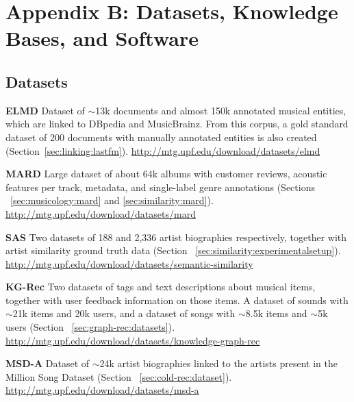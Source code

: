 
\chapter{Appendix B: Datasets, Knowledge Bases, and Software}
\label{appendix:datasets}

\section{Datasets}
\label{appendix:datasets:datasets}

\noindent \textbf{ELMD} Dataset of $\sim$13k documents and almost 150k annotated musical entities, which are linked to DBpedia and MusicBrainz. From this corpus, a gold standard dataset of 200 documents with manually annotated entities is also created (Section~\ref{sec:linking:lastfm}). \url{http://mtg.upf.edu/download/datasets/elmd}

\vspace{0.2cm}

\noindent \textbf{MARD} Large dataset of about 64k albums with customer reviews, acoustic features per track, metadata, and single-label genre annotations (Sections ~\ref{sec:musicology:mard} and \ref{sec:similarity:mard}). \url{http://mtg.upf.edu/download/datasets/mard}

\vspace{0.2cm}

\noindent \textbf{SAS} Two datasets of 188 and 2,336 artist biographies respectively, together with artist similarity ground truth data (Section ~\ref{sec:similarity:experimentalsetup}). \url{http://mtg.upf.edu/download/datasets/semantic-similarity}

\vspace{0.2cm}

\noindent \textbf{KG-Rec} Two datasets of tags and text descriptions about musical items, together with user feedback information on those items. A dataset of sounds with $\sim$21k items and 20k users, and a dataset of songs with $\sim$8.5k items and $\sim$5k users (Section ~\ref{sec:graph-rec:datasets}). \url{http://mtg.upf.edu/download/datasets/knowledge-graph-rec}

\vspace{0.2cm}

\noindent \textbf{MSD-A} Dataset of $\sim$24k artist biographies linked to the artists present in the Million Song Dataset (Section ~\ref{sec:cold-rec:dataset}). \url{http://mtg.upf.edu/download/datasets/msd-a}

